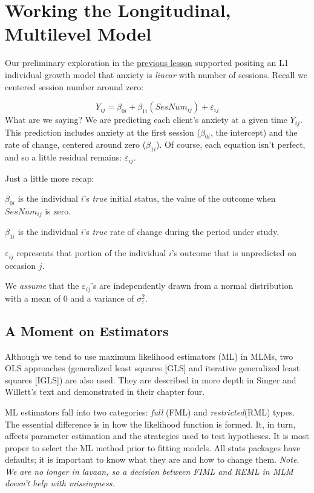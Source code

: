 \documentclass[
  english,
]{book}
\begin{document}
\hypertarget{working-the-longitudinal-multilevel-model}{%
\section{Working the Longitudinal, Multilevel Model}\label{working-the-longitudinal-multilevel-model}}

Our preliminary exploration in the \protect\hyperlink{MLMexplore}{previous lesson} supported positing an L1 individual growth model that anxiety is \emph{linear} with number of sessions. Recall we centered session number around zero:

\[Y_{ij}=\beta_{0i}+\beta _{1i}(SesNum_{ij})+\varepsilon _{ij}\]
What are we saying? We are predicting each client's anxiety at a given time \(Y_{ij}\). This prediction includes anxiety at the first session (\(\beta_{0i}\), the intercept) and the rate of change, centered around zero (\(\beta _{1i}\)). Of course, each equation isn't perfect, and so a little residual remains: \(\varepsilon _{ij}\).

Just a little more recap:

\(\beta _{0i}\) is the individual \(i\)'s \emph{true} initial status, the value of the outcome when \(SesNum_{ij}\) is zero.

\(\beta _{1i}\) is the individual \(i\)'s \emph{true} rate of change during the period under study.

\(\varepsilon _{ij}\) represents that portion of the individual \(i\)'s outcome that is unpredicted on occasion \(j\).

We \emph{assume} that the \(\varepsilon _{ij}\)'s are independently drawn from a normal distribution with a mean of 0 and a variance of \(\sigma _{\varepsilon }^{2}\).

\hypertarget{a-moment-on-estimators}{%
\subsection{A Moment on Estimators}\label{a-moment-on-estimators}}

Although we tend to use maximum likelihood estimators (ML) in MLMs, two OLS approaches (generalized least squares {[}GLS{]} and iterative generalized least squares {[}IGLS{]}) are also used. They are described in more depth in Singer and Willett's text \citeyearpar{singer_applied_2003} and demonstrated in their chapter four.

ML estimators fall into two categories: \emph{full} (FML) and \emph{restricted}(RML) types. The essential difference is in how the likelihood function is formed. It, in turn, affects parameter estimation and the strategies used to test hypotheses. It is most proper to select the ML method prior to fitting models. All stats packages have defaults; it is important to know what they are and how to change them. \emph{Note. We are no longer in lavaan, so a decision between FIML and REML in MLM doesn't help with missingness.}
\end{document}

